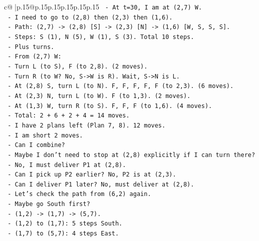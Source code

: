 \documentclass{article}
\begin{document}
{\begin{supertabular}{c@{$\;$}|p{.15\linewidth}@{}p{.15\linewidth}p{.15\linewidth}p{.15\linewidth}p{.15\linewidth}p{.15\linewidth}}
{{{\texttt{            {-} At t=30, I am at (2,7) W.} \\
\texttt{            {-} I need to go to (2,8) then (2,3) then (1,6).} \\
\texttt{            {-} Path: (2,7) {-}> (2,8) {[}S{]} {-}> (2,3) {[}N{]} {-}> (1,6) {[}W, S, S, S{]}.} \\
\texttt{            {-} Steps: S (1), N (5), W (1), S (3). Total 10 steps.} \\
\texttt{            {-} Plus turns.} \\
\texttt{            {-} From (2,7) W:} \\
\texttt{              {-} Turn L (to S), F (to 2,8). (2 moves).} \\
\texttt{              {-} Turn R (to W? No, S{-}>W is R). Wait, S{-}>N is L.} \\
\texttt{              {-} At (2,8) S, turn L (to N). F, F, F, F, F (to 2,3). (6 moves).} \\
\texttt{              {-} At (2,3) N, turn L (to W). F (to 1,3). (2 moves).} \\
\texttt{              {-} At (1,3) W, turn R (to S). F, F, F (to 1,6). (4 moves).} \\
\texttt{              {-} Total: 2 + 6 + 2 + 4 = 14 moves.} \\
\texttt{              {-} I have 2 plans left (Plan 7, 8). 12 moves.} \\
\texttt{              {-} I am short 2 moves.} \\
\texttt{              {-} Can I combine?} \\
\texttt{              {-} Maybe I don't need to stop at (2,8) explicitly if I can turn there?} \\
\texttt{              {-} No, I must deliver P1 at (2,8).} \\
\texttt{              {-} Can I pick up P2 earlier? No, P2 is at (2,3).} \\
\texttt{              {-} Can I deliver P1 later? No, must deliver at (2,8).} \\
\texttt{              {-} Let's check the path from (6,2) again.} \\
\texttt{              {-} Maybe go South first?} \\
\texttt{              {-} (1,2) {-}> (1,7) {-}> (5,7).} \\
\texttt{              {-} (1,2) to (1,7): 5 steps South.} \\
\texttt{              {-} (1,7) to (5,7): 4 steps East.} \\
}}}
\end{supertabular}}
\end{document}
